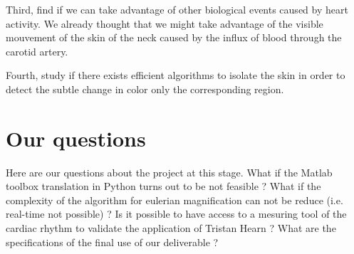 \documentclass[a4paper]{article}
\begin{document}
Third, find if we can take advantage of other biological events caused by heart activity. We already thought that we might take advantage of the visible mouvement of the skin of the neck caused by the influx of blood through the carotid artery.

Fourth, study if there exists efficient algorithms to isolate the skin in order to detect the subtle change in color only the corresponding region.


\section*{Our questions}

Here are our questions about the project at this stage. What if the Matlab toolbox translation in Python turns out to be not feasible ? What if the complexity of the algorithm for eulerian magnification can not be reduce (i.e. real-time not possible) ? Is it possible to have access to a mesuring tool of the cardiac rhythm to validate the application of Tristan Hearn ? What are the specifications of the final use of our deliverable ?




\end{document}
